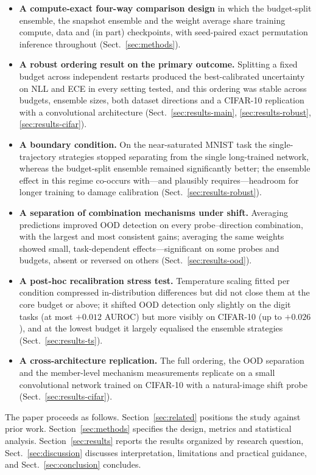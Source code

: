 \documentclass[11pt,a4paper]{article}
\begin{document}
\begin{itemize}[leftmargin=1.4em,itemsep=1.5pt,topsep=2pt]
\item \textbf{A compute-exact four-way comparison design} in which the
budget-split ensemble, the snapshot ensemble and the weight average share
training compute, data and (in part) checkpoints, with seed-paired exact
permutation inference throughout (Sect.~\ref{sec:methods}).
\item \textbf{A robust ordering result on the primary outcome.} Splitting
a fixed budget across independent restarts produced the best-calibrated
uncertainty on NLL and ECE in every setting tested, and this ordering was
stable across budgets, ensemble sizes, both dataset directions and a
CIFAR-10 replication with a convolutional architecture
(Sect.~\ref{sec:results-main}, \ref{sec:results-robust},
\ref{sec:results-cifar}).
\item \textbf{A boundary condition.} On the near-saturated MNIST task the
single-trajectory strategies stopped separating from the single long-trained
network, whereas the budget-split ensemble remained significantly better;
the ensemble effect in this regime co-occurs with---and plausibly
requires---headroom for longer training to damage calibration
(Sect.~\ref{sec:results-robust}).
\item \textbf{A separation of combination mechanisms under shift.} Averaging
predictions improved OOD detection on every probe--direction combination,
with the largest and most consistent gains; averaging the same weights
showed small, task-dependent effects---significant on some probes and
budgets, absent or reversed on others
(Sect.~\ref{sec:results-ood}).
\item \textbf{A post-hoc recalibration stress test.} Temperature scaling
fitted per condition compressed in-distribution differences but did not
close them at the core budget or above; it shifted OOD detection only
slightly on the digit tasks (at most $+0.012$ AUROC) but more visibly on
CIFAR-10 (up to $+0.026$), and at the lowest budget it largely equalised
the ensemble strategies (Sect.~\ref{sec:results-ts}).
\item \textbf{A cross-architecture replication.} The full ordering, the
OOD separation and the member-level mechanism measurements replicate on a
small convolutional network trained on CIFAR-10 with a natural-image shift
probe (Sect.~\ref{sec:results-cifar}).
\end{itemize}

The paper proceeds as follows. Section~\ref{sec:related} positions the study
against prior work. Section~\ref{sec:methods} specifies the design,
metrics and statistical analysis. Section~\ref{sec:results} reports the
results organized by research question, Sect.~\ref{sec:discussion} discusses
interpretation, limitations and practical guidance, and
Sect.~\ref{sec:conclusion} concludes.
\end{document}
